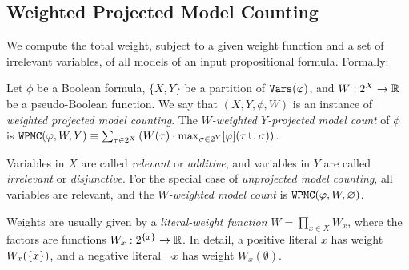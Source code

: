 \subsection{Weighted Projected Model Counting}

We compute the total weight, subject to a given weight function and a set of irrelevant variables, of all models of an input propositional formula.
Formally:
\begin{definition}
     Let $\phi$ be a Boolean formula, $\{X, Y\}$ be a partition of $\texttt{\upshape Vars}(\varphi)$, and $W: 2^X \to \mathbb{R}$ be a pseudo-Boolean function. We say that $(X, Y, \phi, W)$ is an instance of \emph{weighted projected model counting}.
    The \emph{$W$-weighted $Y$-projected model count} of $\phi$ is
    $\texttt{\upshape WPMC}(\varphi, W, Y) \equiv \sum_{\tau \in 2^X} \left(  W(\tau) \cdot \max_{\sigma \in 2^Y} [\varphi](\tau \cup \sigma)  \right)$.
\end{definition}

Variables in $X$ are called \emph{relevant} or \emph{additive}, and variables in $Y$ are called \emph{irrelevant} or \emph{disjunctive}. 
For the special case of \emph{unprojected model counting}, all variables are relevant, and the \emph{$W$-weighted model count} is $\texttt{\upshape WPMC}(\varphi, W, \varnothing)$.

Weights are usually given by a \emph{literal-weight function} $W = \prod_{x \in X} W_x$, where the factors are functions $W_x : 2^{\left\{ x \right\}} \to \mathbb{R}$.
In detail, a positive literal $x$ has weight $W_x(\left\{ x \right\})$, and a negative literal $\neg x$ has weight $W_x(\emptyset)$.

